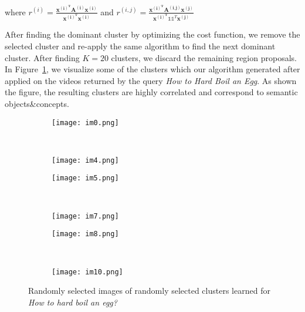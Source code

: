 where $r^{(i)}=\frac{\mathbf{x^{(i)^T}}\mathbf{A^{(i)}}\mathbf{x^{(i)}}}{\mathbf{x^{(i)^T}}\mathbf{x^{(i)}}}$ and $r^{(i,j)}=\frac{\mathbf{x^{(i)^T}}\mathbf{A^{(i,j)}}\mathbf{x^{(j)}}} {\mathbf{x^{(i)^T}}\mathds{1}\mathds{1}^T\mathbf{x^{(j)}}}$

After finding the dominant cluster by optimizing the cost function, we remove the selected cluster and re-apply the same algorithm to find the next dominant cluster. After finding $K=20$ clusters, we discard the remaining region proposals. In Figure~\ref{cvis}, we visualize some of the clusters which our algorithm generated after applied on the videos returned by the query \emph{How to Hard Boil an Egg}. As shown the figure, the resulting clusters are highly correlated and correspond to semantic objects\&concepts.
\begin{figure}[ht]
  \begin{subfigure}[b]{0.23\textwidth}
\texttt{[image: im0.png]}
\end{subfigure}
~
\begin{subfigure}[b]{0.23\textwidth}
\texttt{[image: im4.png]}
\end{subfigure}
\begin{subfigure}[b]{0.23\textwidth}
\texttt{[image: im5.png]}
\end{subfigure}
~
\begin{subfigure}[b]{0.23\textwidth}
\texttt{[image: im7.png]}
\end{subfigure}

\begin{subfigure}[b]{0.23\textwidth}
\texttt{[image: im8.png]}
\end{subfigure}
~
\begin{subfigure}[b]{0.23\textwidth}
\texttt{[image: im10.png]}
\end{subfigure}
\caption{Randomly selected images of randomly selected clusters learned for \emph{How to hard boil an egg?}}
\label{cvis}
\end{figure}
